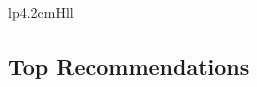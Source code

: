 \documentclass[handout]{beamer}
\begin{document}
\begin{frame}
\begin{table}
\begin{tabular}{lp{4.2cm}Hll}
\bottomrule
\end{tabular}
  \caption[User Profile Recommendations Rated]{User 9's top model scores.}
  \label{tab:user-recommendations-rated-9}
\end{table}
\end{frame}

\subsection{Top Recommendations}
\end{document}
